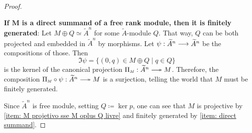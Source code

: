 \begin{proposicao}
\begin{proof}
\begin{itroman}
    \item \label{item: direct summand}\textbf{If $\boldsymbol M$ is a direct summand of a free rank module, then it is finitely generated}: Let $M\oplus Q \simeq {\widetilde{A}}^n$ for some $\widetilde A$-module $Q$. That way, $Q$ can be both projected and embedded in ${\widetilde{A}}^n$ by morphisms. Let $\psi : {\widetilde{A}}^n \longrightarrow {\widetilde{A}}^n$ be the compositions of those. Then
    \[\Im \psi = \{(0,q) \in M \oplus Q \mid q \in Q\}\]
    is the kernel of the canonical projection $\sub \Pi M : {\widetilde{A}}^n \longtwoheadrightarrow M$. Therefore, the composition $\sub \Pi M \circ \psi : {\widetilde{A}}^n \longtwoheadrightarrow M$ is a surjection, telling the world that $M$ must be finitely generated.
\end{itroman}
Since ${\widetilde{A}}^n$ is free module, setting $Q \coloneqq \ker p$, one can see that $M$ is projective by \ref{item: M projetivo sse M oplus Q livre} and finitely generated by \ref{item: direct summand}. 
\end{proof}
\end{proposicao}

